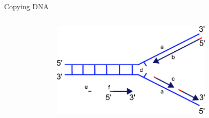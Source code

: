\documentclass[pdf]{beamer}
\begin{document}
\begin{frame}{Copying DNA}
\begin{columns}
\begin{column}{0.3\textwidth}
\begin{figure}[hb]
      \end{figure}
      \footnotemark
    \end{column}
    \pause
    \begin{column}{0.7\textwidth}
      \begin{figure}[hb]
        \includegraphics[width=0.8\textwidth]{images/Replication_fork}
      \end{figure}
      \footnotemark
    \end{column}
  \end{columns}
\end{frame}
\end{document}
